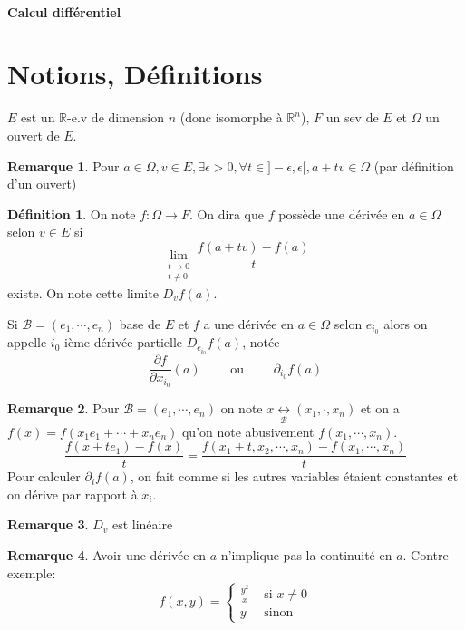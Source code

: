 \documentclass{article}
\theoremstyle{definition}
\newtheorem*{dfn}{Définition}
\newtheorem*{rem}{Remarque}
\begin{document}
~

\vspace{1cm}

\begin{center}
\textbf{\LARGE Calcul différentiel} \\[1em]
\end{center}
\tableofcontents
\thispagestyle{empty}

\newpage
\setcounter{page}{1}
\section{Notions, Définitions}

$E$ est un $\mathbb R$-e.v de dimension $n$ (donc isomorphe à $\mathbb R^n$), $F$ un sev de $E$ et $\Omega$ un ouvert de $E$.

\begin{rem}
Pour $a\in\Omega, v\in E, \exists \epsilon>0, \forall t\in ]-\epsilon, \epsilon[, a+tv\in\Omega$ (par définition d'un ouvert)
\end{rem}

\begin{dfn}
On note $f:\Omega \longrightarrow F$. On dira que $f$ possède une dérivée en $a\in\Omega$ selon $v\in E$ si \[
    \lim_{\substack{t\to 0\\ t\neq 0}}\frac{f(a+tv)-f(a)}t
\] existe. On note cette limite $D_vf(a)$.

Si $\mathcal B=(e_1,\cdots, e_n)$ base de $E$ et $f$ a une dérivée en $a\in\Omega$ selon $e_{i_0}$ alors on appelle $i_0$-ième dérivée partielle $D_{e_{i_0}}f(a)$, notée \[
    \frac{\partial f}{\partial x_{i_0}}(a)\qquad \text{ ou }\qquad \partial_{i_0}f(a)
\]
\end{dfn}

\begin{rem}
Pour $\mathcal B=(e_1, \cdots, e_n)$ on note $x\underset{\mathcal B}{\longleftrightarrow}(x_1, \cdot, x_n)$ et on a $f(x)=f(x_1e_1+\cdots + x_ne_n)$ qu'on note abusivement $f(x_1, \cdots, x_n)$. \[
    \frac{f(x+te_1)-f(x)}{t}=\frac{f(x_1+t, x_2, \cdots, x_n)-f(x_1, \cdots, x_n)}{t}
\]
Pour calculer $\partial_if(a)$, on fait comme si les autres variables étaient constantes et on dérive par rapport à $x_i$.
\end{rem}

\begin{rem}
$D_v$ est linéaire
\end{rem}

\begin{rem}
Avoir une dérivée en $a$ n'implique pas la continuité en $a$. Contre-exemple: \[
    f(x, y)=\begin{cases}
    \frac{y^2}x &\text{ si }x\neq 0\\ y & \text{ sinon}
    \end{cases}
\]
\end{rem}
\end{document}
